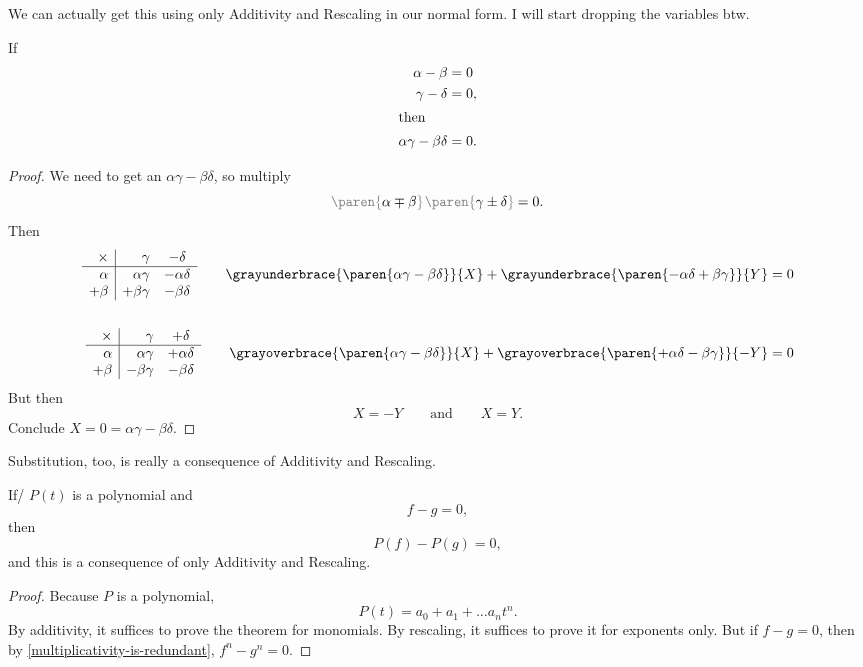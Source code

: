 \documentclass[a5paper]{scrartcl}
\newcommand{\gray}[1]{{\color{gray}#1}}
\newcommand{\black}[1]{{\color{black}#1}}
\newcommand{\gparen}[1]{\left .\!{\gray{\paren{\black{#1}}}}\!\right.}
\theoremstyle{nonumberplain}
\begin{document}
We can actually get this using only Additivity and Rescaling in our normal form.
I will start dropping the variables btw.
\begin{theorem}\label{multiplicativity-is-redundant}
  If
  \begin{align*}
    \alpha - \beta &= 0 \\
    \gamma - \delta &= 0,  \\
    \shortintertext{then}
    \alpha\gamma - \beta\delta &= 0 .
  \end{align*}
\end{theorem}
\begin{proof}
  We need to get an \(\alpha\gamma-\beta\delta\), so multiply
  \[
    \gparen{\alpha\mp\beta}\gparen{\gamma\pm\delta} = 0.
  \]
  Then
  \begin{align*}
    \begin{array}{r|rc}
      \times & \gamma       &-\delta \\
      \hline
      \alpha & \alpha\gamma & -\alpha\delta       \\
      +\beta & +\beta\gamma  & - \beta\delta
    \end{array}
    \qquad
    \grayunderbrace{\paren{\alpha\gamma-\beta\delta}}{X} + \grayunderbrace{\paren{-\alpha\delta + \beta\gamma}}{Y} &= 0 \\ \\
    \begin{array}{r|rc}
      \times & \gamma       &+\delta \\
      \hline
      \alpha & \alpha\gamma & +\alpha\delta       \\
      +\beta & -\beta\gamma  & - \beta\delta
    \end{array}
    \qquad
    \grayoverbrace{\paren{\alpha\gamma-\beta\delta}}{X} + \grayoverbrace{\paren{+\alpha\delta - \beta\gamma}}{-Y} &= 0
  \end{align*}
  But then
  \[
    X = -Y \qquad \text{and} \qquad X = Y.
  \]
  Conclude \(X =0= \alpha\gamma-\beta\delta\).
\end{proof}

Substitution, too, is really a consequence of Additivity and Rescaling.
\begin{theorem}
  If\eit/ \(P(t)\) is a polynomial and
  \[
    f -g= 0,
  \]
  then
  \[
    P(f)-P(g) = 0,
  \]
  and this is a consequence of only Additivity and Rescaling.
\end{theorem}
\begin{proof}
  Because \(P\) is a polynomial,
  \[
    P(t) = a_0 + a_1 + \dots a_n t^n.
  \]
  By additivity, it suffices to prove the theorem for monomials. By rescaling, it suffices to prove it for exponents only. But if \(f-g=0\), then by \cref{multiplicativity-is-redundant}, \(f^n-g^n = 0\).
\end{proof}
\end{document}
